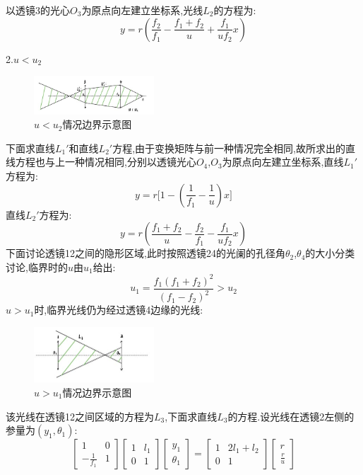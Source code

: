 \documentclass[UTF8]{gapd}
\begin{document}
以透镜3的光心$O_3$为原点向左建立坐标系,光线$L_2$的方程为:
\begin{equation}
  y=r(\frac{f_2}{f_1}-\frac{f_1+f_2}{u}+\frac{f_1}{uf_2}x   )
\end{equation}

2.$u<u_2$
\begin{figure}
  \centering
  \includegraphics[width=0.4\textwidth]{images/7.jpg}
  \caption{$u<u_2$情况边界示意图}
  \label{fig:7}
\end{figure}
下面求直线$L_1'$和直线$L_2'$方程,由于变换矩阵与前一种情况完全相同,故所求出的直线方程也与上一种情况相同,分别以透镜光心$O_4$,$O_3$为原点向左建立坐标系,直线$L_1'$方程为:
\begin{equation}
  y=r\big[1-(\frac{1}{f_1} -\frac{1}{u} )x\big]
\end{equation}
直线$L_2'$方程为:
\begin{equation}
  y=r(\frac{f_1+f_2}{u}-\frac{f_2}{f_1}-\frac{f_1}{uf_2}x   )
\end{equation}
下面讨论透镜12之间的隐形区域,此时按照透镜24的光阑的孔径角$\theta_2$,$\theta_4$的大小分类讨论,临界时的$u$由$u_1$给出:
\begin{equation}
  u_1=\frac{f_1(f_1+f_2)^2}{(f_1-f_2)^2} >u_2
\end{equation}
$u>u_1$时,临界光线仍为经过透镜4边缘的光线:
\begin{figure}
  \centering
  \includegraphics[width=0.4\textwidth]{images/8.jpg}
  \caption{$u>u_1$情况边界示意图}
\end{figure}
该光线在透镜12之间区域的方程为$L_3$,下面求直线$L_3$的方程.设光线在透镜2左侧的参量为$(y_1,\theta_1 )$:
\begin{equation}
  \begin{bmatrix}
      1 & 0\\
      -\frac{1}{f_1} & 1
  \end{bmatrix}
  \begin{bmatrix}
      1&l_1\\
      0&1
  \end{bmatrix}
  \begin{bmatrix}
      y_1\\
      \theta_1
  \end{bmatrix}=
  \begin{bmatrix}
      1 & 2l_1+l_2\\
     0 & 1
  \end{bmatrix}
  \begin{bmatrix}
      r\\
      \frac{r}{u} 
  \end{bmatrix}
\end{equation}
\end{document}
